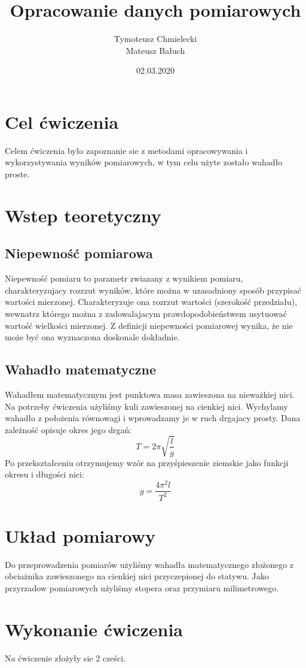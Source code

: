 \documentclass[11pt]{article}
\title{\textbf{Opracowanie danych pomiarowych}}
\author{Tymoteusz Chmielecki\\
		Mateusz Bałuch}
\date{02.03.2020}
\begin{document}
\maketitle

\section{Cel ćwiczenia}
Celem ćwiczenia było zapoznanie sie z metodami opracowywania i wykorzystywania wyników pomiarowych, w tym celu użyte zostało wahadło proste.

\section{Wstep teoretyczny}
\subsection{Niepewność pomiarowa}
Niepewność pomiaru to parametr zwiazany z wynikiem pomiaru, charakteryzujacy rozrzut wyników, które można w uzasadniony sposób przypisać wartości mierzonej. Charakteryzuje ona
rozrzut wartości (szerokość przedziału), wewnatrz którego można z zadowalajacym prawdopodobieństwem usytuować wartość wielkości mierzonej. Z definicji niepewności pomiarowej wynika, że nie może być ona wyznaczona doskonale dokładnie.
\subsection{Wahadło matematyczne}
Wahadłem matematycznym jest punktowa masa zawieszona na nieważkiej nici. Na potrzeby ćwiczenia użyliśmy kuli zawieszonej na cienkiej nici. Wychylamy wahadło z położenia równowagi i wprowadzamy je w ruch drgajacy prosty. Dana zależność opisuje okres jego drgań: $$ T = 2\pi\sqrt{\frac{l}{g}} $$
Po przekształceniu otrzymujemy wzór na przyśpieszenie ziemskie jako funkcji okresu i długości nici: $$ g = \frac{4{\pi}^2l}{T^2} $$

\section{Układ pomiarowy}
Do przeprowadzenia pomiarów użyliśmy wahadła matematycznego złożonego z obciażnika zawieszonego na cienkiej nici przyczepionej do statywu. Jako przyrzadow pomiarowych użyliśmy stopera oraz przymiaru milimetrowego.

\section{Wykonanie ćwiczenia}
Na ćwiczenie złożyły sie 2 cześci.
\end{document}
